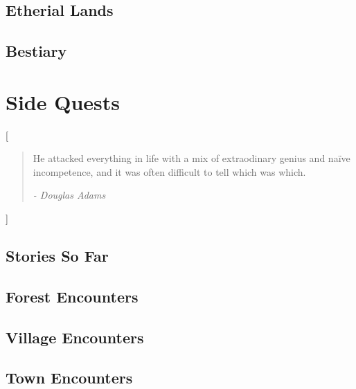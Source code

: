 \documentclass[a4paper,openany]{report}
\begin{document}
\chapter{Etherial Lands}




\chapter{Bestiary}





\part{Side Quests}[\vspace{4cm}\begin{quote}
\center He attacked everything in life with a mix of extraodinary genius and na\"ive incompetence, and it was often difficult to tell which was which.

	\flushright\textit{- Douglas Adams}
\end{quote}

\vspace{3cm}

]

\chapter{Stories So Far}



\chapter{Forest Encounters}

\newcommand{\lescounter}{\addtocounter{enc}{-1}}




\chapter{Village Encounters}



\chapter{Town Encounters}






\printglossary

\label{lastpage}

\printindex


\end{document}
